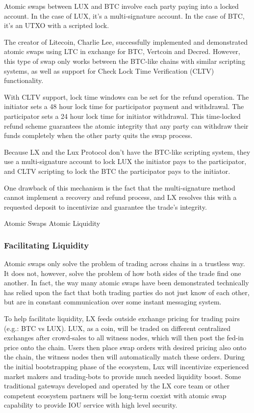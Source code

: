 \documentclass[11pt]{article}
\begin{document}
Atomic swaps between LUX and BTC involve each party paying into a locked account. In the case of LUX, it's a multi-signature account. In the case of BTC, it's an UTXO with a scripted lock.


The creator of Litecoin, Charlie Lee, successfully implemented and demonstrated atomic swaps using LTC in exchange for BTC, Vertcoin and Decred. However, this type of swap only works between the BTC-like chains with similar scripting systems, as well as support for Check Lock Time Verification (CLTV) functionality.


With CLTV support, lock time windows can be set for the refund operation. The initiator sets a 48 hour lock time for participator payment and withdrawal. The participator sets a 24 hour lock time for initiator withdrawal. This time-locked refund scheme guarantees the atomic integrity that any party can withdraw their funds completely when the other party quits the swap process.


Because LX and the Lux Protocol don't have the BTC-like scripting system, they use a multi-signature account to lock LUX the initiator pays to the participator, and CLTV scripting to lock the BTC the participator pays to the initiator.


One drawback of this mechanism is the fact that the multi-signature method cannot implement a recovery and refund process, and LX resolves this with a requested deposit to incentivize and guarantee the trade's integrity.


Atomic Swaps				Atomic Liquidity


\subsubsection{Facilitating Liquidity}

Atomic swaps only solve the problem of trading across chains in a trustless way. It does not, however, solve the problem of how both sides of the trade find one another. In fact, the way many atomic swaps have been demonstrated technically has relied upon the fact that both trading parties do not just know of each other, but are in constant communication over some instant messaging system.


To help facilitate liquidity, LX feeds outside exchange pricing for trading pairs (e.g.: BTC vs LUX). LUX, as a coin, will be traded on different centralized exchanges after crowd-sales to all witness nodes, which will then post the fed-in price onto the chain. Users then place swap orders with desired pricing also onto the chain, the witness nodes then will automatically match these orders. During the initial bootstrapping phase of the ecosystem, Lux will incentivize experienced market makers and trading-bots to provide much needed liquidity boost. Some traditional gateways developed and operated by the LX core team or other competent ecosystem partners will be long-term coexist with atomic swap capability to provide IOU service with high level security.
\end{document}
